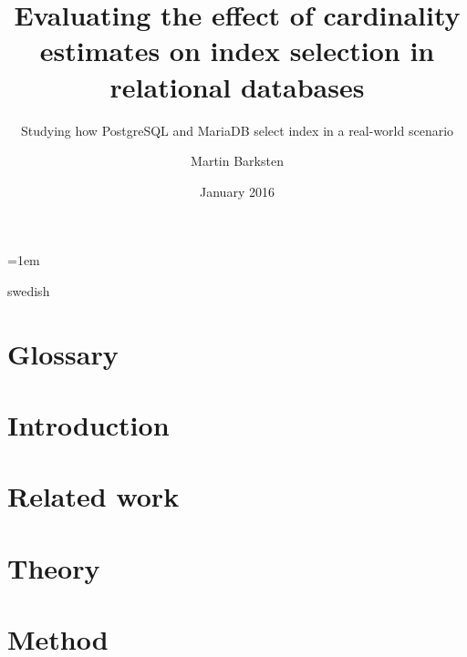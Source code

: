 \documentclass[a4paper,11pt]{kth-mag}
\title{Evaluating the effect of cardinality estimates on index selection in
  relational databases}
\subtitle{Studying how PostgreSQL and MariaDB select index in a real-world scenario}
\author{Martin Barksten}
\date{January 2016}
\begin{document}
\lstset{basicstyle=\ttfamily,breaklines=true}
\lstset{frame=lines}
\emergencystretch=1em
\pgfplotsset{width=10cm, compat=1.9}
\tabulinesep=1.2mm

\newcommand{\clj}[1]{\texttt{#1}}
\newcommand{\sql}[1]{\texttt{#1}}
\newenvironment{indexgraph}{
  \begin{tikzpicture}
    \begin{axis}[
      ybar,
      legend style={at={(0.5,-0.15)},
        anchor=north,legend columns=-1},
      symbolic x coords={mm,book,resamb,cmm,cmt,t,est,ct,mt},
      ylabel={\#index},
      xtick=data,
      nodes near coords,
      nodes near coords align={vertical},
      width=12cm]
} {
  \legend{possible indexes, ambiguous indexes}
\end{axis}
\end{tikzpicture}}

\frontmatter
\pagestyle{empty}
\removepagenumbers
\maketitle
{}
\begin{abstract}
    
\end{abstract}
\clearpage
\begin{foreignabstract}{swedish}
    
\end{foreignabstract}
\clearpage
\tableofcontents*
\clearpage
\listoffigures
\mainmatter
\pagestyle{newchap}

\chapter{Glossary} \label{chap:glossary}
    
\chapter{Introduction} \label{chap:introduction}
    
\chapter{Related work} \label{chap:relatedwork}
    
\chapter{Theory} \label{chap:theory}
    
\chapter{Method} \label{chap:method}
    
\end{document}
